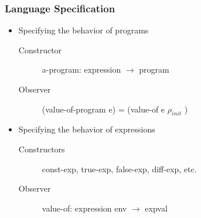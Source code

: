 \documentclass{beamer}
\newcommand{\arrow}{\(\rightarrow\)}
\begin{document}
\begin{frame}[fragile]
\frametitle{Language Specification}
\begin{scriptsize}
\begin{itemize}
\item<1-> Specifying the behavior of programs
  \begin{description}
    \item[Constructor] a-program: expression \arrow{} program
    \item[Observer] (value-of-program e) = (value-of e $\rho_{init}$ )
  \end{description}

\item<1-> Specifying the behavior of expressions
  \begin{description}
    \item[Constructors] const-exp, true-exp, false-exp, diff-exp, etc.
    \item[Observer] value-of: expression env \arrow{} expval
  \end{description}

\end{itemize}
\end{scriptsize}
\end{frame}
\end{document}
